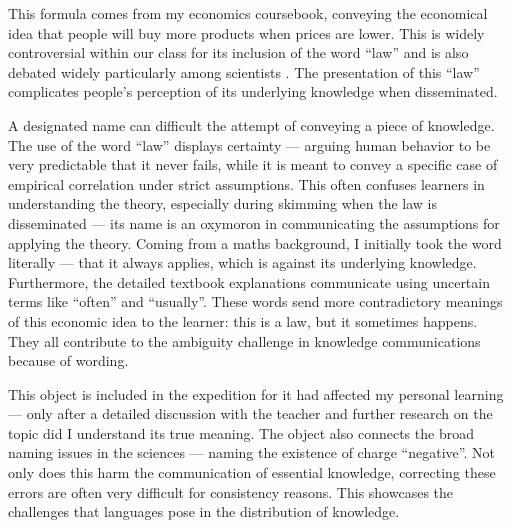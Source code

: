 \documentclass[a4paper,11pt]{article}
\begin{document}
This formula comes from my economics coursebook, conveying the economical idea that people will buy more products when prices are lower. This is widely controversial within our class for its inclusion of the word ``law'' and is also debated widely particularly among scientists \parencite{DKahneman}. The presentation of this ``law'' complicates people's perception of its underlying knowledge when disseminated.

A designated name can difficult the attempt of conveying a piece of knowledge.
The use of the word ``law'' displays certainty --- arguing human behavior to be very predictable that it never fails, while it is meant to convey a specific case of empirical correlation under strict assumptions. This often confuses learners in understanding the theory, especially during skimming when the law is disseminated  --- its name is an oxymoron in communicating the assumptions for applying the theory. Coming from a maths background, I initially took the word literally --- that it always applies, which is against its underlying knowledge. Furthermore, the detailed textbook explanations communicate using uncertain terms like ``often'' and ``usually''.
These words send more contradictory meanings of this economic idea to the learner: this is a law, but it sometimes happens. They all contribute to the ambiguity challenge in knowledge communications because of wording.

This object is included in the expedition for it had affected my personal learning --- only after a detailed discussion with the teacher and further research on the topic did I understand its true meaning. The object also connects the broad naming issues in the sciences --- naming the existence of charge ``negative''. Not only does this harm the communication of essential knowledge, correcting these errors are often very difficult for consistency reasons. This showcases the challenges that languages pose in the distribution of knowledge.

\end{document}
